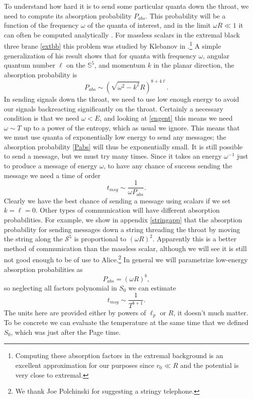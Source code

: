 \documentclass[12pt]{article}
\newcommand{\be}{\begin{equation}}
\newcommand{\ee}{\end{equation}}
\begin{document}
To understand how hard it is to send some particular quanta down the throat, we need to compute its absorption probability $P_{abs}$.  This probability will be a function of the frequency $\omega$ of the quanta of interest, and in the limit $\omega R\ll1$ it can often be computed analytically \cite{Das:1996we}.  For massless scalars in the extremal black three brane \eqref{extbb} this problem was studied by Klebanov in \cite{igor1}.\footnote{Computing these absorption factors in the extremal background is an excellent approximation for our purposes since $r_0\ll R$ and the potential is very close to extremal.}  A simple generalization of his result shows that for quanta with frequency $\omega$, angular quantum number $\ell$ on the $\mathbb{S}^5$, and momentum $k$ in the planar direction, the absorption probability is
\be\label{Pabs}
P_{abs}\sim \left(\sqrt{\omega^2-k^2}R\right)^{8+4\ell}.
\ee
In sending signals down the throat, we need to use low enough energy to avoid our signals backreacting significantly on the throat.  Certainly a necessary condition is that we need $\omega<E$, and looking at \eqref{engent} this means we need $\omega\sim T$ up to a power of the entropy, which as usual we ignore.  This means that we must use quanta of exponentially low energy to send any messages; the absorption probability \eqref{Pabs} will thus be exponentially small.  It is still possible to send a message, but we must try many times.  Since it takes an energy $\omega^{-1}$ just to produce a message of energy $\omega$, to have any chance of success sending the message we need a time of order
\be
t_{msg}\sim \frac{1}{\omega P_{abs}}.
\ee
Clearly we have the best chance of sending a message using scalars if we set $k=\ell=0$.  Other types of communication will have different absorption probabilities. For example, we show in appendix \ref{stringapp} that the absorption probability for sending messages down a string threading the throat by moving the string along the $\mathcal{S}^5$ is proportional to $(\omega R)^2$.  Apparently this is a better method of communication than the massless scalar, although we will see it is still not good enough to be of use to Alice.\footnote{We thank Joe Polchinski for suggesting a stringy telephone.}  In general we will parametrize low-energy absorption probabilities as
\be\label{Pgen}
P_{abs}=(\omega R)^b,
\ee  
so neglecting all factors polynomial in $S_0$ we can estimate
\be\label{tmsg}
t_{msg}\sim \frac{1}{T^{b+1}}.
\ee
The units here are provided either by powers of $\ell_p$ or $R$, it doesn't much matter.  To be concrete we can evaluate the temperature at the same time that we defined $S_0$, which was just after the Page time.  
\end{document}
